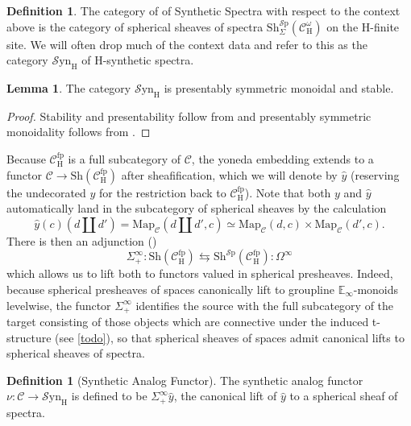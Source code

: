 \documentclass[10pt]{amsart}
\theoremstyle{definition}
\numberwithin{figure}{section}
\numberwithin{equation}{section}
\newtheorem{lemma}[figure]{Lemma}
\newtheorem{definition}[figure]{Definition}
\newcommand{\cC}{\mathcal{C}}
\theoremstyle{cited}
\newcommand{\bE}{\mathbb{E}}
\newcommand{\Sp}{{\mathcal{S}\mathrm{p}}}
\newcommand{\Map}{\mathrm{Map}}
\newcommand{\Sh}{\mathrm{Sh}}
\newcommand{\fp}{\mathrm{fp}}
\newcommand{\Syn}{\mathcal{S}\mathrm{yn}}
\renewcommand{\H}{\mathrm{H}}
\begin{document}
\begin{definition}\label{def:synsp}
  The category of of Synthetic Spectra with respect to the context above is the category of spherical sheaves of spectra $\Sh^\Sp_\Sigma(\cC^\omega_\H)$ on the $\H$-finite site. We will often drop much of the context data and refer to this as the category $\Syn_\H$ of $\H$-synthetic spectra.
\end{definition}

\begin{lemma}\label{lem:synispsms}
  The category $\Syn_\H$ is presentably symmetric monoidal and stable.
\end{lemma}

\begin{proof}
  Stability and presentability follow from \cite[Corollary 2.13]{Pst22} and presentably symmetric monoidality follows from \cite[Proposition 2.30]{Pst22}.
\end{proof}

Because $\cC_\H^\fp$ is a full subcategory of $\cC$, the yoneda embedding extends to a functor $\cC\to \Sh(\cC_\H^\fp)$ after sheafification, which we will denote by $\hat y$ (reserving the undecorated $y$ for the restriction back to $\cC^\fp_\H$). Note that both $y$ and $\hat y$ automatically land in the subcategory of spherical sheaves by the calculation
\[
  \hat y(c)(d\amalg d')=\Map_{\cC}(d\amalg d', c)\simeq \Map_{\cC}(d, c)\times \Map_{\cC}(d', c).
\]
There is then an adjunction (\cite{Pst22})
\[
\Sigma^\infty_+:\Sh(\cC_\H^\fp) \leftrightarrows \Sh^\Sp(\cC_\H^\fp):\Omega^\infty
\]
which allows us to lift both to functors valued in spherical presheaves. Indeed, because spherical presheaves of spaces canonically lift to groupline $\bE_\infty$-monoids levelwise, the functor $\Sigma_+^\infty$ identifies the source with the full subcategory of the target consisting of those objects which are connective under the induced t-structure (see \ref{todo}), so that spherical sheaves of spaces admit canonical lifts to spherical sheaves of spectra.

\begin{definition}[Synthetic Analog Functor]\label{def:synanalog}
  The synthetic analog functor $\nu:\cC\to \Syn_\H$ is defined to be $\Sigma_+^\infty \hat y$, the canonical lift of $\hat y$ to a spherical sheaf of spectra.
\end{definition}
\end{document}

